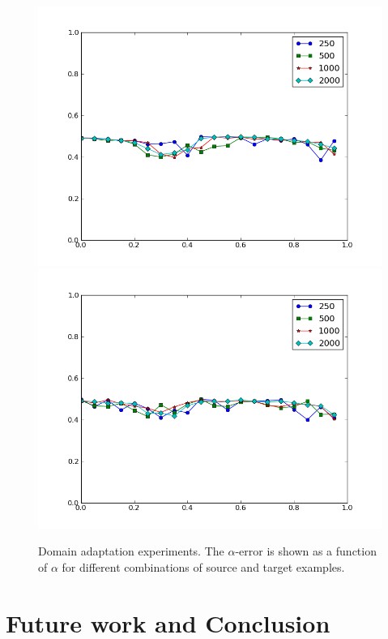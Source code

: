 \documentclass[letterpaper]{article}
\begin{document}
\begin{figure}
  \subfigure%
  {\includegraphics[scale=.3]{adaptation_err_S}}
  \subfigure%
  {\includegraphics[scale=.3]{adaptation_err_T}}
  \caption{Domain adaptation experiments. The $\alpha$-error is shown as a function of $\alpha$ for different combinations of source and target examples.}
  \label{fig:domain-adaptation}
\end{figure}

\section{Future work and Conclusion}
\label{sec:future-work}
\end{document}
